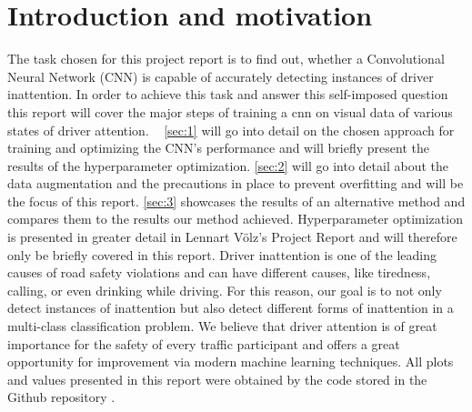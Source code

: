 \section{Introduction and motivation}
The task chosen for this project report is to find out, whether a Convolutional Neural Network (CNN) is capable of accurately detecting instances of driver inattention. 
In order to achieve this task and answer this self-imposed question this report will cover the major steps of training a cnn on visual data of various states of driver attention.  
\autoref{sec:1} will go into detail on the chosen approach for training and optimizing the CNN's performance and will briefly present the results of the hyperparameter optimization. \autoref{sec:2} will go into detail about the data augmentation and the precautions in place to prevent overfitting and will be the focus of this report.
\autoref{sec:3} showcases the results of an alternative method and compares them to the results our method achieved.
Hyperparameter optimization is presented in greater detail in Lennart Völz's Project Report \cite{lennard} and will therefore only be briefly covered in this report. 
Driver inattention is one of the leading causes of road safety violations and can have different causes, like tiredness, calling, or even drinking while driving. For this reason, our goal is to not only detect instances of inattention 
but also detect different forms of inattention in a multi-class classification problem. We believe that driver attention is of great importance for the safety of every traffic participant and offers a great opportunity for improvement via 
modern machine learning techniques. All plots and values presented in this report were obtained by the code stored in the Github repository \cite{github}.